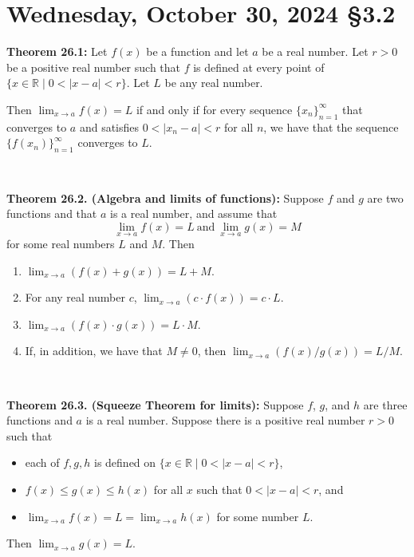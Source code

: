\documentclass[12pt]{amsart}
\def\We{Wednesday}
\newcommand{\R}{{\mathbb{R}}}
\numberwithin{equation}{section}
\theoremstyle{plain} %
\newcommand{\Oct}[3]{\section{#2, October #1, 2024 \quad \S#3}}
\theoremstyle{definition}
\theoremstyle{remark}
\begin{document}
\newpage


\Oct{30}{\We}{3.2}



	\begin{framed}
\noindent \textbf{Theorem 26.1:}  Let $f(x)$ be a function and let $a$ be a real number.
  Let $r > 0$ be a positive real number such that
  $f$ is defined
  at every point of ${\{x \in \R \mid 0 < |x-a| < r\}}$.
    Let $L$ be any real number. 

Then $\lim_{x \to a} f(x) = L$ if and only if for every sequence 
$\{x_n\}_{n=1}^\infty$ that converges to $a$ and satisfies $0 < |x_n - a| < r$ for all $n$, we have that the sequence $\{f(x_n)\}_{n=1}^\infty$ converges to $L$. 

\
	
	\noindent \textbf{Theorem 26.2. (Algebra and limits of functions):} Suppose $f$ and $g$ are two functions and that $a$ is a real number, and
	assume  that 
	$$
	\lim_{x \to a} f(x) = L  \ \text{and} \  \lim_{x \to a} g(x) = M
	$$
	for some real numbers $L$ and $M$. Then
	\begin{enumerate}
		\item $\lim_{x \to a} (f(x) + g(x)) = L  + M$.
		\item For any real number $c$, $\lim_{x \to a} (c \cdot f(x)) = c \cdot L$.
		\item $\lim_{x \to a} (f(x) \cdot g(x)) = L \cdot M$.
		\item If, in addition, we have that $M \ne 0$,
		then $\lim_{x \to a} (f(x)/g(x)) = L/M$.
	\end{enumerate}
	
	\
	
	\noindent \textbf{Theorem 26.3. (Squeeze Theorem for limits):}  Suppose $f$, $g$, and $h$ are three functions and $a$ is a real number. Suppose there is a positive real number $r > 0$
	such that 
	\begin{itemize}
		\item each of $f,g,h$ is defined on $\{x \in \R \mid 0 < |x-a| < r\}$,
		\item $f(x) \leq g(x) \leq h(x)$ for all
		$x$ such that $0 < |x-a| < r$, and
		\item	$\lim_{x \to a} f(x) = L = \lim_{x \to    a} h(x)$ for some number $L$.
	\end{itemize}  
	Then $\lim_{x \to a} g(x) = L$.
\end{framed}	
	
\end{document}
